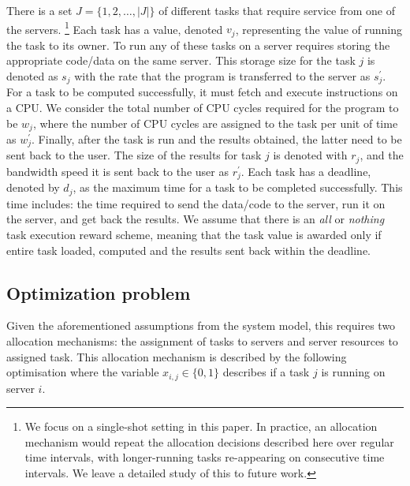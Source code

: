 There is a set $J = \{1,2,\ldots,\left| J \right|\}$ of different tasks that require service from one of the servers.
\footnote{We focus on a single-shot setting in this paper. In practice, an allocation mechanism would repeat the
allocation decisions described here over regular time intervals, with longer-running tasks re-appearing on consecutive
time intervals. We leave a detailed study of this to future work.} Each task has a value, denoted $v_j$, representing
the value of running the task to its owner. To run any of these tasks on a server requires storing the appropriate
code/data on the same server. This storage size for the task $j$ is denoted as $s_j$ with the rate that the program
is transferred to the server as $s^{'}_j$. For a task to be computed successfully, it must fetch and execute
instructions on a CPU. We consider the total number of CPU cycles required for the program to be $w_j$, where the
number of CPU cycles are assigned to the task per unit of time as $w^{'}_j$. Finally, after the task is run and the
results obtained, the latter need to be sent back to the user. The size of the results for task $j$ is denoted with
$r_j$, and the bandwidth speed it is sent back to the user as $r^{'}_j$. Each task has a deadline, denoted by $d_j$,
as the maximum time for a task to be completed successfully. This time includes: the time required to send the
data/code to the server, run it on the server, and get back the results. We assume that there is an \emph{all} or
\emph{nothing} task execution reward scheme, meaning that the task value is awarded only if entire task loaded,
computed and the results sent back within the deadline.

\subsection{Optimization problem}\label{subsec:optimisation-problem}
Given the aforementioned assumptions from the system model, this requires two allocation mechanisms: the assignment of
tasks to servers and server resources to assigned task. This allocation mechanism is described by the following
optimisation where the variable $x_{i,j} \in \{0, 1\}$ describes if a task $j$ is running on server $i$.


